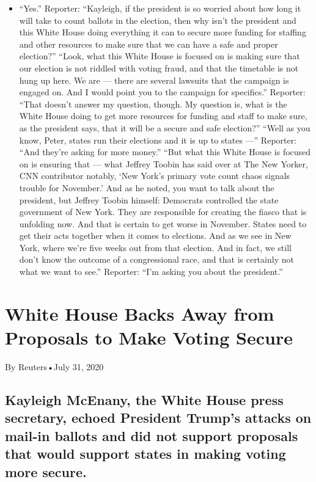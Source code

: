 \begin{itemize}
\tightlist
\item
  ``Yes.'' Reporter: ``Kayleigh, if the president is so worried about
  how long it will take to count ballots in the election, then why isn't
  the president and this White House doing everything it can to secure
  more funding for staffing and other resources to make sure that we can
  have a safe and proper election?'' ``Look, what this White House is
  focused on is making sure that our election is not riddled with voting
  fraud, and that the timetable is not hung up here. We are --- there
  are several lawsuits that the campaign is engaged on. And I would
  point you to the campaign for specifics.'' Reporter: ``That doesn't
  answer my question, though. My question is, what is the White House
  doing to get more resources for funding and staff to make sure, as the
  president says, that it will be a secure and safe election?'' ``Well
  as you know, Peter, states run their elections and it is up to states
  ---'' Reporter: ``And they're asking for more money.'' ``But what this
  White House is focused on is ensuring that --- what Jeffrey Toobin has
  said over at The New Yorker, CNN contributor notably, `New York's
  primary vote count chaos signals trouble for November.' And as he
  noted, you want to talk about the president, but Jeffrey Toobin
  himself: Democrats controlled the state government of New York. They
  are responsible for creating the fiasco that is unfolding now. And
  that is certain to get worse in November. States need to get their
  acts together when it comes to elections. And as we see in New York,
  where we're five weeks out from that election. And in fact, we still
  don't know the outcome of a congressional race, and that is certainly
  not what we want to see.'' Reporter: ``I'm asking you about the
  president.''
\end{itemize}

\hypertarget{white-house-backs-away-from-proposals-to-make-voting-secure-1}{%
\section{White House Backs Away from Proposals to Make Voting
Secure}\label{white-house-backs-away-from-proposals-to-make-voting-secure-1}}

By Reuters•July 31, 2020

\hypertarget{kayleigh-mcenany-the-white-house-press-secretary-echoed-president-trumps-attacks-on-mail-in-ballots-and-did-not-support-proposals-that-would-support-states-in-making-voting-more-secure-1}{%
\subsection{Kayleigh McEnany, the White House press secretary, echoed
President Trump's attacks on mail-in ballots and did not support
proposals that would support states in making voting more
secure.}\label{kayleigh-mcenany-the-white-house-press-secretary-echoed-president-trumps-attacks-on-mail-in-ballots-and-did-not-support-proposals-that-would-support-states-in-making-voting-more-secure-1}}


